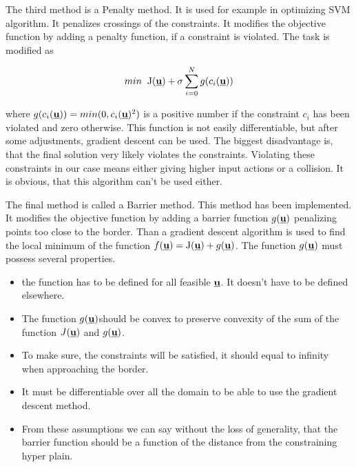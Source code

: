 \documentclass{article}
\newcommand{\uvec}{\textbf{\underline{u}}}
\newcommand{\macf}{f(\uvec)}
\begin{document}
The third method is a Penalty method. It is used for example in optimizing SVM algorithm. It penalizes crossings of the constraints. It modifies the objective function by adding a penalty function, if a constraint is violated. The task is modified as 

\begin{equation}
min\;\;\mathrm{J}(\uvec) + \sigma\sum_{i = 0}^N g(c_i(\uvec))
\end{equation}

where $g(c_i(\uvec)) = min(0, c_i(\uvec)^2)$ is a positive number if the constraint $c_i$ has been violated and zero otherwise. This function is not easily differentiable, but after some adjustments, gradient descent can be used. The biggest disadvantage is, that the final solution very likely violates the constraints. Violating these constraints in our case means either giving higher input actions or a collision. It is obvious, that this algorithm can't be used either.  

The final method is called a Barrier method. This method has been implemented. It modifies the objective function by adding a barrier function $g(\uvec)$ penalizing points too close to the border. Than a gradient descent algorithm is used to find the local minimum of the function $\macf = \mathrm{J}(\uvec) + g(\uvec)$. The function $g(\uvec)$ must possess several properties. 

\begin{itemize}
\item the function has to be defined for all feasible $\uvec$. It doesn't have to be defined elsewhere.
\item The function $g(\uvec)$should be convex to preserve convexity of the sum of the function $J(\uvec)$ and $g(\uvec)$.
\item  To make sure, the constraints will be satisfied, it should equal to infinity when approaching the border.
\item It must be differentiable over all the domain to be able to use the gradient descent method.
\item From these assumptions we can say without the loss of generality, that the barrier function should be a function of the distance from the constraining hyper plain.
\end{itemize}
\end{document}
